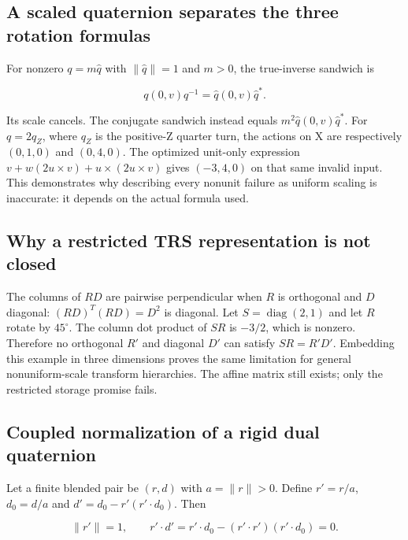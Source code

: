 \subsection{A scaled quaternion separates the three rotation formulas}\label{02-foundations-ii-ch039-a-scaled-quaternion-separates-the-three-rotation-formulas}

For nonzero \(q=m\widehat q\) with \(\|\widehat q\|=1\) and \(m>0\), the true-inverse sandwich is

\[
q(0,v)q^{-1}=\widehat q(0,v)\widehat q^*.
\]

Its scale cancels. The conjugate sandwich instead equals \(m^2\widehat q(0,v)\widehat q^*\). For \(q=2q_Z\), where \(q_Z\) is the positive-Z quarter turn, the actions on X are respectively \((0,1,0)\) and \((0,4,0)\). The optimized unit-only expression \(v+w(2u\times v)+u\times(2u\times v)\) gives \((-3,4,0)\) on that same invalid input. This demonstrates why describing every nonunit failure as uniform scaling is inaccurate: it depends on the actual formula used.

\subsection{Why a restricted TRS representation is not closed}\label{02-foundations-ii-ch039-why-a-restricted-trs-representation-is-not-closed}

The columns of \(RD\) are pairwise perpendicular when \(R\) is orthogonal and \(D\) diagonal: \((RD)^T(RD)=D^2\) is diagonal. Let \(S=\operatorname{diag}(2,1)\) and let \(R\) rotate by \(45^\circ\). The column dot product of \(SR\) is \(-3/2\), which is nonzero. Therefore no orthogonal \(R'\) and diagonal \(D'\) can satisfy \(SR=R'D'\). Embedding this example in three dimensions proves the same limitation for general nonuniform-scale transform hierarchies. The affine matrix still exists; only the restricted storage promise fails.

\subsection{Coupled normalization of a rigid dual quaternion}\label{02-foundations-ii-ch039-coupled-normalization-of-a-rigid-dual-quaternion}

Let a finite blended pair be \((r,d)\) with \(a=\|r\|>0\). Define \(r'=r/a\), \(d_0=d/a\) and \(d'=d_0-r'(r'\cdot d_0)\). Then

\[
\|r'\|=1,\qquad r'\cdot d'=r'\cdot d_0-(r'\cdot r')(r'\cdot d_0)=0.
\]

